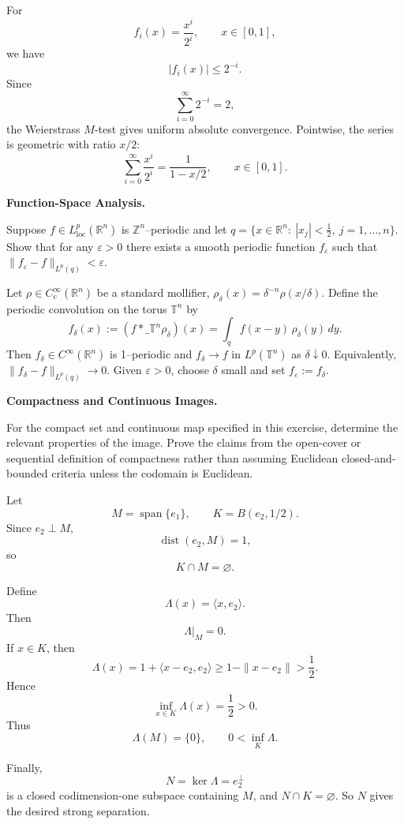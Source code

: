 \begin{solution}
For
\[
f_i(x)=\frac{x^i}{2^i},
\qquad x\in[0,1],
\]
we have
\[
|f_i(x)|\le2^{-i}.
\]
Since
\[
\sum_{i=0}^{\infty}2^{-i}=2,
\]
the Weierstrass \(M\)-test gives uniform absolute convergence. Pointwise, the series is
geometric with ratio \(x/2\):
\[
\boxed{
\sum_{i=0}^{\infty}\frac{x^i}{2^i}
=
\frac{1}{1-x/2},
\qquad
x\in[0,1].
}
\]
\end{solution}


\begin{problem}[CP-II-0374]
\label{prob:cp-ii-0374}
\textbf{Function-Space Analysis.}

\hspace*{1.5em}Suppose $f\in L^p_{\mathrm{loc}}(\mathbb R^n)$ is $\mathbb Z^n$--periodic and let
$q=\{x\in\mathbb R^n:\ |x_j|<\tfrac12,\ j=1,\dots,n\}$.
Show that for any $\varepsilon>0$ there exists a smooth periodic function $f_\varepsilon$
such that $\|f_\varepsilon-f\|_{L^p(q)}<\varepsilon$.
\end{problem}

\begin{solution}
Let $\rho\in C_c^\infty(\mathbb R^n)$ be a standard mollifier, $\rho_\delta(x)=\delta^{-n}\rho(x/\delta)$.
Define the periodic convolution on the torus $\mathbb T^n$ by
\[
f_\delta(x):=(f*\_{\mathbb T^n}\rho_\delta)(x)=\int_{q} f(x-y)\,\rho_\delta(y)\,dy.
\]
Then $f_\delta\in C^\infty(\mathbb R^n)$ is 1--periodic and $f_\delta\to f$ in $L^p(\mathbb T^n)$ as $\delta\downarrow0$.
Equivalently, $\|f_\delta-f\|_{L^p(q)}\to0$. Given $\varepsilon>0$, choose $\delta$ small and set $f_\varepsilon:=f_\delta$.

\bigskip
\end{solution}

\begin{problem}[CP-II-0376]
\label{prob:cp-ii-0376}
\textbf{Compactness and Continuous Images.}

\hspace*{1.5em}For the compact set and continuous map specified in this exercise, determine
the relevant properties of the image. Prove the claims from the open-cover or
sequential definition of compactness rather than assuming Euclidean
closed-and-bounded criteria unless the codomain is Euclidean.
\end{problem}

\begin{solution}
Let
\[
M=\operatorname{span}\{e_1\},
\qquad
K=B(e_2,1/2).
\]
Since \(e_2\perp M\),
\[
\operatorname{dist}(e_2,M)=1,
\]
so
\[
K\cap M=\varnothing.
\]

Define
\[
\Lambda(x)=\langle x,e_2\rangle.
\]
Then
\[
\Lambda|_M=0.
\]
If \(x\in K\), then
\[
\Lambda(x)
=
1+\langle x-e_2,e_2\rangle
\ge
1-\|x-e_2\|
>
\frac12.
\]
Hence
\[
\inf_{x\in K}\Lambda(x)=\frac12>0.
\]
Thus
\[
\boxed{
\Lambda(M)=\{0\},
\qquad
0<\inf_K\Lambda.
}
\]

Finally,
\[
N=\ker\Lambda=e_2^\perp
\]
is a closed codimension-one subspace containing \(M\), and \(N\cap K=\varnothing\).
So \(N\) gives the desired strong separation.
\end{solution}


